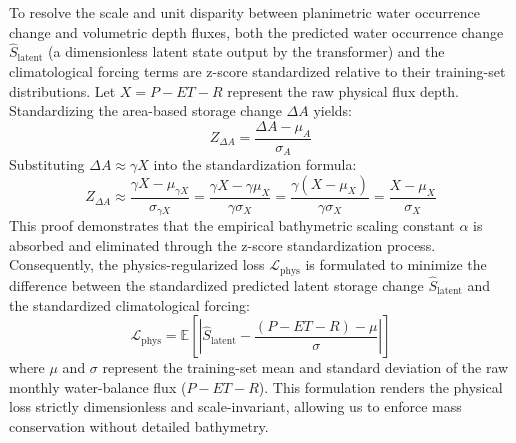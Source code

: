 \documentclass[preprint,12pt]{elsarticle}
\begin{document}
To resolve the scale and unit disparity between planimetric water occurrence change and volumetric depth fluxes, both the predicted water occurrence change $\hat{S}_{\text{latent}}$ (a dimensionless latent state output by the transformer) and the climatological forcing terms are z-score standardized relative to their training-set distributions. Let $X = P - ET - R$ represent the raw physical flux depth. Standardizing the area-based storage change $\Delta A$ yields:
\begin{equation}
Z_{\Delta A} = \frac{\Delta A - \mu_A}{\sigma_A}
\end{equation}
Substituting $\Delta A \approx \gamma X$ into the standardization formula:
\begin{equation}
Z_{\Delta A} \approx \frac{\gamma X - \mu_{\gamma X}}{\sigma_{\gamma X}} = \frac{\gamma X - \gamma \mu_X}{\gamma \sigma_X} = \frac{\gamma(X - \mu_X)}{\gamma \sigma_X} = \frac{X - \mu_X}{\sigma_X}
\end{equation}
This proof demonstrates that the empirical bathymetric scaling constant $\alpha$ is absorbed and eliminated through the z-score standardization process. Consequently, the physics-regularized loss $\mathcal{L}_{\text{phys}}$ is formulated to minimize the difference between the standardized predicted latent storage change $\hat{S}_{\text{latent}}$ and the standardized climatological forcing:
\begin{equation}
\mathcal{L}_{\text{phys}} = \mathbb{E}\left[\left|\hat{S}_{\text{latent}} - \frac{(P - ET - R) - \mu}{\sigma}\right|\right]
\end{equation}
where $\mu$ and $\sigma$ represent the training-set mean and standard deviation of the raw monthly water-balance flux ($P - ET - R$). This formulation renders the physical loss strictly dimensionless and scale-invariant, allowing us to enforce mass conservation without detailed bathymetry.
\end{document}
